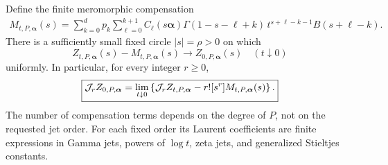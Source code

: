 \begin{theorem}\label{asj:thm:untwist}
Define the finite meromorphic compensation
\begin{align}\label{asj:eq:general-counter}
 M_{t,P,\boldsymbol\alpha}(s)
  =\sum_{k=0}^d p_k\sum_{\ell=0}^{k+1}
      C_\ell(s\boldsymbol\alpha)
      \Gamma(1-s-\ell+k)\,
       t^{s+\ell-k-1} B(s+\ell-k).
\end{align}
There is a sufficiently small fixed circle $|s|=\rho>0$ on which
\begin{equation}\label{asj:eq:uniform-untwist}
 Z_{t,P,\boldsymbol\alpha}(s)-M_{t,P,\boldsymbol\alpha}(s)
      \longrightarrow Z_{0,P,\boldsymbol\alpha}(s)
       \quad(t\downarrow0)
\end{equation}
uniformly. In particular, for every integer $r\ge0$,
\begin{equation}\label{asj:eq:jet-untwist}
 \boxed{\displaystyle
 \mathcal J_r Z_{0,P,\boldsymbol\alpha}
   =\lim_{t\downarrow0}\left\{
      \mathcal J_r Z_{t,P,\boldsymbol\alpha}
                 -r![s^r]M_{t,P,\boldsymbol\alpha}(s)\right\}.}
\end{equation}
The number of compensation terms depends on the degree of $P$, not on
the requested jet order. For each fixed order its Laurent coefficients
are finite expressions in Gamma jets, powers of $\log t$, zeta jets,
and generalized Stieltjes constants.
\end{theorem}
